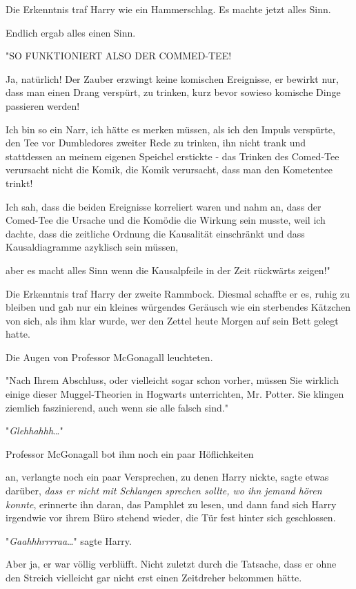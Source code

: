 {Die Erkenntnis traf Harry wie ein Hammerschlag. Es machte jetzt alles Sinn.

Endlich ergab alles einen Sinn.

"SO FUNKTIONIERT ALSO DER COMMED-TEE!

Ja, natürlich! Der Zauber erzwingt keine komischen Ereignisse, er bewirkt nur, dass man einen Drang verspürt, zu trinken, kurz bevor sowieso komische Dinge passieren werden!

Ich bin so ein Narr, ich hätte es merken müssen, als ich den Impuls verspürte, den Tee vor Dumbledores zweiter Rede zu trinken, ihn nicht trank und stattdessen an meinem eigenen Speichel erstickte - das Trinken des Comed-Tee verursacht nicht die Komik, die Komik verursacht, dass man den Kometentee trinkt!

Ich sah, dass die beiden Ereignisse korreliert waren und nahm an, dass der Comed-Tee die Ursache und die Komödie die Wirkung sein musste, weil ich dachte, dass die zeitliche Ordnung die Kausalität einschränkt und dass Kausaldiagramme azyklisch sein müssen,

aber es macht alles Sinn wenn die Kausalpfeile in der Zeit rückwärts zeigen!"

Die Erkenntnis traf Harry der zweite Rammbock. Diesmal schaffte er es, ruhig zu bleiben und gab nur ein kleines würgendes Geräusch wie ein sterbendes Kätzchen von sich, als ihm klar wurde, wer den Zettel heute Morgen auf sein Bett gelegt hatte.

Die Augen von Professor McGonagall leuchteten.

"Nach Ihrem Abschluss, oder vielleicht sogar schon vorher, müssen Sie wirklich einige dieser Muggel-Theorien in Hogwarts unterrichten, Mr. Potter. Sie klingen ziemlich faszinierend, auch wenn sie alle falsch sind."

"\emph{Glehhahhh}…"

Professor McGonagall bot ihm noch ein paar Höflichkeiten

an, verlangte noch ein paar Versprechen, zu denen Harry nickte, sagte etwas darüber, \emph{dass er nicht mit Schlangen sprechen sollte, wo ihn jemand hören konnte}, erinnerte ihn daran, das Pamphlet zu lesen, und dann fand sich Harry irgendwie vor ihrem Büro stehend wieder, die Tür fest hinter sich geschlossen.

"\emph{Gaahhhrrrraa}…" sagte Harry.

Aber ja, er war völlig verblüfft. Nicht zuletzt durch die Tatsache, dass er ohne den Streich vielleicht gar nicht erst einen Zeitdreher bekommen hätte.

}
